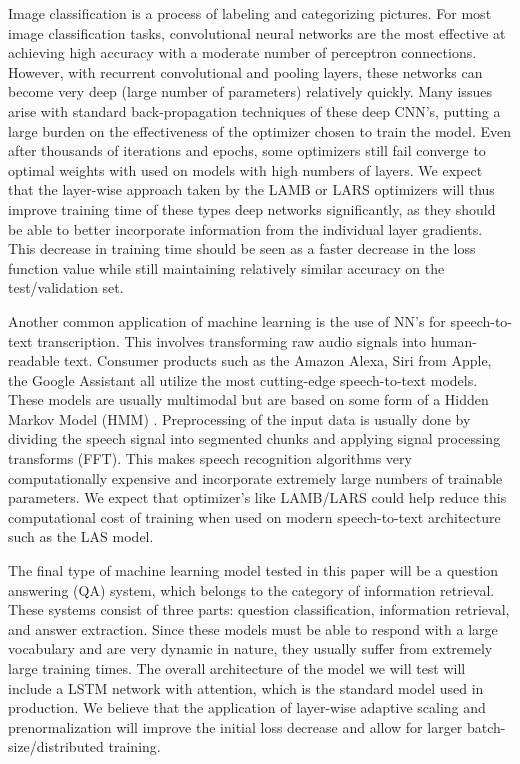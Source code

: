 Image classification is a process of labeling and categorizing pictures. For most image classification tasks, convolutional neural networks are the most effective at achieving high accuracy with a moderate number of perceptron connections. However, with recurrent convolutional and pooling layers, these networks can become very deep (large number of parameters) relatively quickly\cite{CNN}. Many issues arise with standard back-propagation techniques of these deep CNN's, putting a large burden on the effectiveness of the optimizer chosen to train the model. Even after thousands of iterations and epochs, some optimizers still fail converge to optimal weights\cite{Sun2019OptimizationFD} with used on models with high numbers of layers. We expect that the layer-wise approach taken by the LAMB or LARS optimizers will thus improve training time of these types deep networks significantly, as they should be able to better incorporate information from the individual layer gradients. This decrease in training time should be seen as a faster decrease in the loss function value while still maintaining relatively similar accuracy on the test/validation set.

Another common application of machine learning is the use of NN's for speech-to-text transcription. This involves transforming raw audio signals into human-readable text. Consumer products such as the Amazon Alexa, Siri from Apple, the Google Assistant all utilize the most cutting-edge speech-to-text models. These models are usually multimodal but are based on some form of a Hidden Markov Model (HMM) \cite{HMM}. Preprocessing of the input data is usually done by dividing the speech signal into segmented chunks and applying signal processing transforms (FFT)\cite{FFT}. This makes speech recognition algorithms very computationally expensive and incorporate extremely large numbers of trainable parameters. We expect that optimizer's like LAMB/LARS could help reduce this computational cost of training when used on modern speech-to-text architecture such as the LAS model\cite{LAS}.

The final type of machine learning model tested in this paper will be a question answering (QA) system, which belongs to the category of information retrieval. These systems consist of three parts: question classification, information retrieval, and answer extraction. Since these models  must be able to respond with a large vocabulary and are very dynamic in nature, they usually suffer from extremely large training times. The overall architecture of the model we will test will include a LSTM network with attention, which is the standard model used in production. We believe that the application of layer-wise adaptive scaling and prenormalization will improve the initial loss decrease and allow for larger batch-size/distributed training.\\






